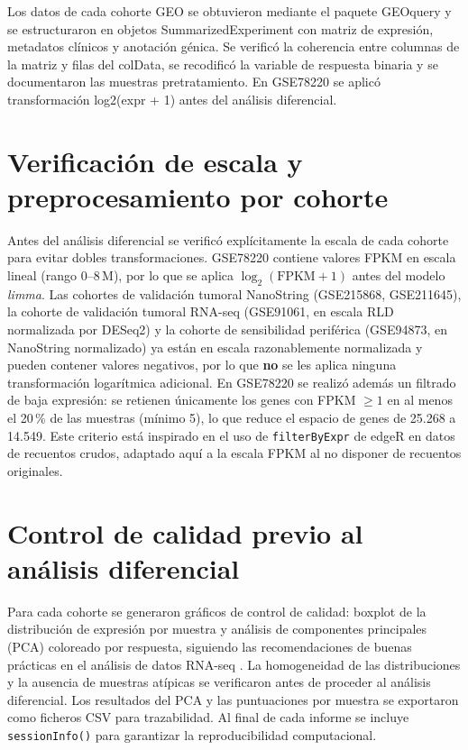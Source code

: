 Los datos de cada cohorte GEO se obtuvieron mediante el paquete GEOquery \cite{Davis2007} y se estructuraron en objetos SummarizedExperiment con matriz de expresión, metadatos clínicos y anotación génica. Se verificó la coherencia entre columnas de la matriz y filas del colData, se recodificó la variable de respuesta binaria y se documentaron las muestras pretratamiento. En GSE78220 se aplicó transformación log2(expr + 1) antes del análisis diferencial.

\section{Verificación de escala y preprocesamiento por cohorte}

Antes del análisis diferencial se verificó explícitamente la escala de cada cohorte para evitar dobles transformaciones. GSE78220 contiene valores FPKM en escala lineal (rango 0--8\,M), por lo que se aplica $\log_2(\text{FPKM}+1)$ antes del modelo \textit{limma}. Las cohortes de validación tumoral NanoString (GSE215868, GSE211645), la cohorte de validación tumoral RNA-seq (GSE91061, en escala RLD normalizada por DESeq2) y la cohorte de sensibilidad periférica (GSE94873, en NanoString normalizado) ya están en escala razonablemente normalizada y pueden contener valores negativos, por lo que \textbf{no} se les aplica ninguna transformación logarítmica adicional. En GSE78220 se realizó además un filtrado de baja expresión: se retienen únicamente los genes con FPKM $\geq 1$ en al menos el 20\,\% de las muestras (mínimo 5), lo que reduce el espacio de genes de 25.268 a 14.549. Este criterio está inspirado en el uso de \texttt{filterByExpr} de edgeR \cite{Robinson2010} en datos de recuentos crudos, adaptado aquí a la escala FPKM al no disponer de recuentos originales.

\section{Control de calidad previo al análisis diferencial}

Para cada cohorte se generaron gráficos de control de calidad: boxplot de la distribución de expresión por muestra y análisis de componentes principales (PCA) coloreado por respuesta, siguiendo las recomendaciones de buenas prácticas en el análisis de datos RNA-seq \cite{Conesa2016}. La homogeneidad de las distribuciones y la ausencia de muestras atípicas se verificaron antes de proceder al análisis diferencial. Los resultados del PCA y las puntuaciones por muestra se exportaron como ficheros CSV para trazabilidad. Al final de cada informe se incluye \texttt{sessionInfo()} para garantizar la reproducibilidad computacional.


